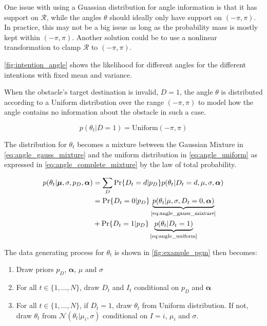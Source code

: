 One issue with using a Guassian distribution for angle information is that it has support on $\mathcal{R}$, while the angles $\theta$ should ideally only have support on $(-\pi, \pi)$. In practice, this may not be a big issue as long as the probability mass is mostly kept within $(-\pi, \pi)$. Another solution could be to use a nonlinear transformation to clamp $\mathcal{R}$ to $(-\pi, \pi)$.

\cref{fig:intention_angle} shows the likelihood for different angles for the different intentions with fixed mean and variance. 

When the obstacle's target destination is invalid, $D=1$, the angle $\theta$ is distributed according to a Uniform distribution over the range $(-\pi, \pi)$ to model how the angle contains no information about the obstacle in such a case. 

\begin{equation}\label{eq:angle_uniform}
    p(\theta_t | D=1) = \text{Uniform}(-\pi, \pi)
\end{equation}

The distribution for $\theta_t$ becomes a mixture between the Gaussian Mixture in \cref{eq:angle_gauss_mixture} and the uniform distribution in  \cref{eq:angle_uniform} as expressed in \cref{eq:angle_complete_mixture} by the law of total probability.

\begin{align}\label{eq:angle_complete_mixture}
\begin{split}
     p(\theta_t | \boldsymbol{\mu}, \sigma, p_D, \boldsymbol{\alpha})
     &= \sum_D \Pr\{D_t=d | p_D\} p(\theta_t | D_t=d, \mu, \sigma, \boldsymbol{\alpha})\\
     &= \Pr\{D_t = 0 | p_D\} \underbrace{p(\theta_t | \mu, \sigma, D_t=0, \boldsymbol{\alpha})}_{\text{\cref{eq:angle_gauss_mixture}}}\\
     &+ \Pr\{D_t=1 | p_D\}\underbrace{p(\theta_t | D_t=1)}_{\text{\cref{eq:angle_uniform}}}
\end{split}
\end{align}

The data generating process for $\theta_t$ is shown in \cref{fig:example_pgm} then becomes:

\begin{enumerate}
    \item Draw priors $p_D$, $\boldsymbol{\alpha}$, $\mu$ and $\sigma$
    \item For all $t \in \{1, \dots, N \}$, draw $D_t$ and $I_t$ conditional on $p_D$ and $\boldsymbol{\alpha}$
    \item For all $t \in \{1, \dots, N\} $, if $D_t=1$, draw $\theta_t$ from Uniform distribution. If not, draw $\theta_t$ from $\mathcal{N}(\theta_t | \mu_i, \sigma)$ conditional on $I=i$, $\mu_i$ and $\sigma$. 
\end{enumerate}

